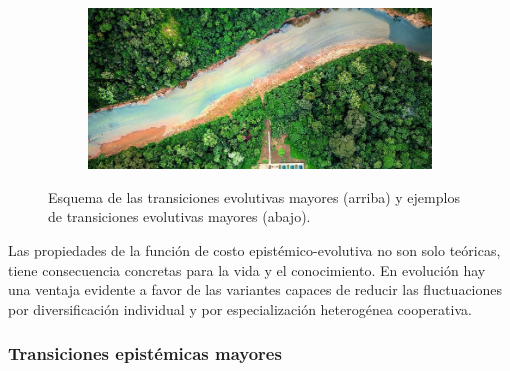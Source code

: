 \documentclass[a4paper,11pt]{book}
\theoremstyle{definition}
\newif\ifen
\newif\ifes
\newcommand{\En}[1]{\ifen#1\fi}
\newcommand{\Es}[1]{\ifes#1\fi}
\begin{document}
\begin{figure}[ht!]
\begin{subfigure}[b]{0.235\textwidth}
  \caption*{\En{Societies}}
 \end{subfigure}
 \begin{subfigure}[b]{0.235\textwidth} \centering
 \includegraphics[width=\linewidth]{static/tsimane2.jpg}
  \caption*{\En{Ecosystems}}
 \end{subfigure}
 \caption{
Esquema de las transiciones evolutivas mayores (arriba) y ejemplos de transiciones evolutivas mayores (abajo).
 }
 \label{fig:trans}
 \vspace{-0.3cm}
 \end{figure}

Las propiedades de la funci\'on de costo epist\'emico-evolutiva no son solo te\'oricas, tiene consecuencia concretas para la vida y el conocimiento.
%
En evoluci\'on hay una ventaja evidente a favor de las variantes capaces de reducir las fluctuaciones por diversificaci\'on individual y por especializaci\'on heterog\'enea cooperativa.


\subsubsection{Transiciones epist\'emicas mayores}




%
%
%
\end{document}
